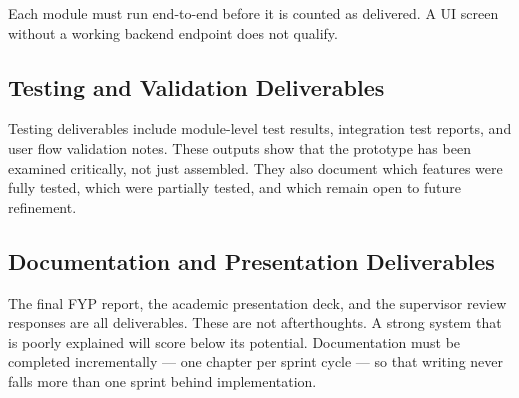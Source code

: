 Each module must run end-to-end before it is counted as delivered. A UI screen without a working backend endpoint does not qualify.

\subsection{Testing and Validation Deliverables}

Testing deliverables include module-level test results, integration test reports, and user flow validation notes. These outputs show that the prototype has been examined critically, not just assembled. They also document which features were fully tested, which were partially tested, and which remain open to future refinement.

\subsection{Documentation and Presentation Deliverables}

The final FYP report, the academic presentation deck, and the supervisor review responses are all deliverables. These are not afterthoughts. A strong system that is poorly explained will score below its potential. Documentation must be completed incrementally — one chapter per sprint cycle — so that writing never falls more than one sprint behind implementation.
